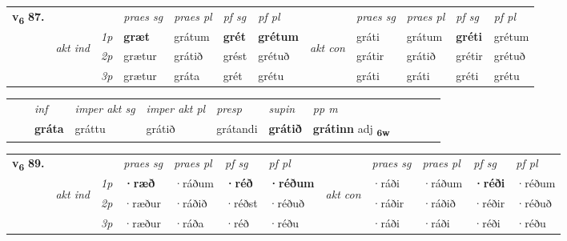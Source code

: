 \begin{tabular}{llllllllllll} \toprule
\multirow{4}{*}{{{\textbf{v{\textsubscript{6}}} \Large{\textbf{87.}}}}}  & &   &  \textit{praes sg}  & \textit{praes pl}  &\textit{ pf sg} & \textit{pf pl} &  &  \textit{praes sg}  & \textit{praes pl}  & \textit{pf sg} & \textit{pf pl } \\*
	\cmidrule{4-7} \cmidrule{9-12}
 & \multirow{3}{*}{\begin{turn}{90}\textit{akt ind}\end{turn}} & {\textit{1p}} & \textbf{græt} & grátum    & \textbf{grét} & \textbf{grétum} & \multirow{3}{*}{\begin{turn}{90}\textit{akt con}\end{turn}} &gráti & grátum & \textbf{gréti} & grétum\\*
& &  {\textit{2p}} &  grætur  & grátið   & grést & grétuð & & grátir & grátið & grétir & grétuð \\*
& &  {\textit{3p}} & grætur & gráta   & grét & grétu & & gráti & gráti& gréti & grétu  \\*
\cmidrule{4-7} \cmidrule{9-12}
\end{tabular}


\begin{tabular}{llllllllllll}
 & & \textit{inf} & \textit{imper akt sg} & \textit{imper akt pl}   & \textit{presp} & \textit{supin}  & \textit{pp m}     \\*
  & & \textbf{gráta} & gráttu  & grátið   & grátandi &  \textbf{grátið}  & \textbf{grátinn} adj \textbf{\textsubscript{6w}} \\*
\cmidrule{1-12}
\end{tabular}



\begin{tabular}{llllllllllll} \toprule
\multirow{4}{*}{{{\textbf{v{\textsubscript{6}}} \Large{\textbf{89.}}}}}  & &   &  \textit{praes sg}  & \textit{praes pl}  &\textit{ pf sg} & \textit{pf pl} &  &  \textit{praes sg}  & \textit{praes pl}  & \textit{pf sg} & \textit{pf pl } \\*
	\cmidrule{4-7} \cmidrule{9-12}
 & \multirow{3}{*}{\begin{turn}{90}\textit{akt ind}\end{turn}} & {\textit{1p}} & \textbf{·ræð} & ·ráðum    & \textbf{·réð} & \textbf{·réðum} & \multirow{3}{*}{\begin{turn}{90}\textit{akt con}\end{turn}} &·ráði & ·ráðum & \textbf{·réði} & ·réðum\\*
& &  {\textit{2p}} &  ·ræður  & ·ráðið   & ·réðst & ·réðuð & & ·ráðir & ·ráðið & ·réðir & ·réðuð \\*
& &  {\textit{3p}} & ·ræður & ·ráða   & ·réð & ·réðu & & ·ráði & ·ráði& ·réði & ·réðu  \\*
\cmidrule{4-7} \cmidrule{9-12}
\end{tabular}


